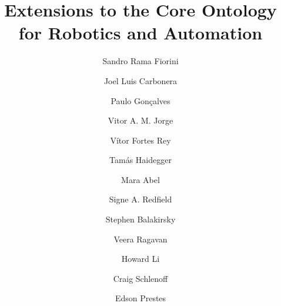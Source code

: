 \documentclass[preprint,12pt]{elsarticle}
\begin{document}
\begin{frontmatter}



\title{Extensions to the Core Ontology for Robotics and Automation}


\author[ufrgs]{Sandro Rama Fiorini}

\author[ufrgs]{Joel Luis Carbonera}

\author[paulo1,paulo2]{Paulo Gon\c calves}

\author[ufrgs]{Vitor A. M. Jorge}

\author[ufrgs]{V\'itor Fortes Rey}

\author[tamas1,tamas2]{Tam\'as Haidegger}

\author[ufrgs]{Mara Abel}

\author[signe]{Signe A. Redfield}

\author[stephen]{Stephen Balakirsky}

\author[veera]{Veera Ragavan}

\author[howard]{Howard Li}

\author[craig]{Craig Schlenoff}

\author[ufrgs]{Edson Prestes}

\address[ufrgs]{Instituto de Inform{\'a}tica, UFRGS, Brazil}

\address[paulo1]{Polytechnic Institute of Castelo Branco, School of Technology, Portugal}


\end{frontmatter}
\end{document}
